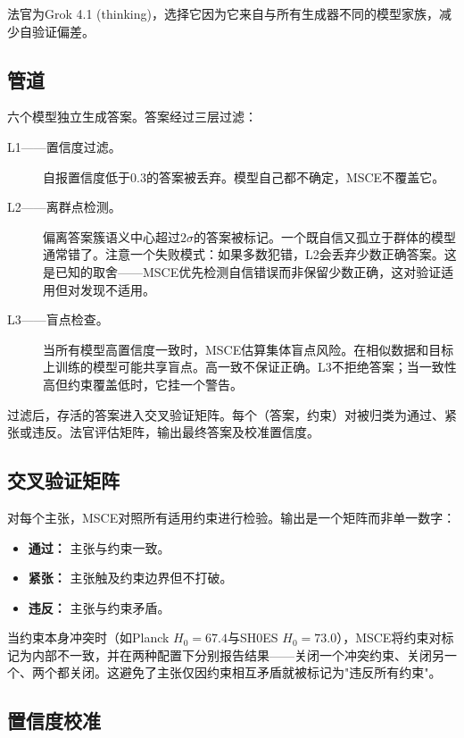 \documentclass[11pt,a4paper]{ctexart}
\begin{document}
法官为Grok 4.1 (thinking)，选择它因为它来自与所有生成器不同的模型家族，减少自验证偏差。

\subsection{管道}

六个模型独立生成答案。答案经过三层过滤：

\begin{description}
\item[L1——置信度过滤。] 自报置信度低于0.3的答案被丢弃。模型自己都不确定，MSCE不覆盖它。

\item[L2——离群点检测。] 偏离答案簇语义中心超过$2\sigma$的答案被标记。一个既自信又孤立于群体的模型通常错了。注意一个失败模式：如果多数犯错，L2会丢弃少数正确答案。这是已知的取舍——MSCE优先检测自信错误而非保留少数正确，这对验证适用但对发现不适用。

\item[L3——盲点检查。] 当所有模型高置信度一致时，MSCE估算集体盲点风险。在相似数据和目标上训练的模型可能共享盲点。高一致不保证正确。L3不拒绝答案；当一致性高但约束覆盖低时，它挂一个警告。
\end{description}

过滤后，存活的答案进入交叉验证矩阵。每个（答案，约束）对被归类为通过、紧张或违反。法官评估矩阵，输出最终答案及校准置信度。

\subsection{交叉验证矩阵}

对每个主张，MSCE对照所有适用约束进行检验。输出是一个矩阵而非单一数字：

\begin{itemize}
    \item \textbf{通过：} 主张与约束一致。
    \item \textbf{紧张：} 主张触及约束边界但不打破。
    \item \textbf{违反：} 主张与约束矛盾。
\end{itemize}

当约束本身冲突时（如Planck $H_0 = 67.4$与SH0ES $H_0 = 73.0$），MSCE将约束对标记为内部不一致，并在两种配置下分别报告结果——关闭一个冲突约束、关闭另一个、两个都关闭。这避免了主张仅因约束相互矛盾就被标记为"违反所有约束"。

\subsection{置信度校准}
\end{document}
